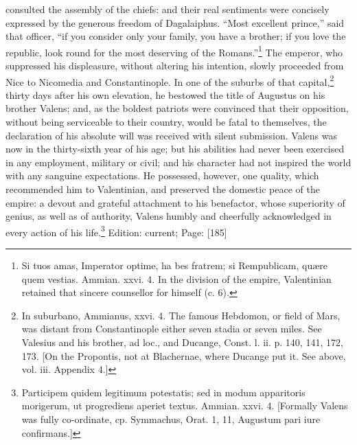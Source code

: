 consulted the assembly of the chiefs: and their real sentiments were concisely expressed by the generous freedom of Dagalaiphus. \texthebrew{“}Most excellent prince,\texthebrew{}” said that officer, \texthebrew{“}if you consider only your family, you have a brother; if you love the republic, look round for the most deserving of the Romans.\texthebrew{}”\footnote{Si tuos amas, Imperator optime, ha bes fratrem; si Rempublicam, quære quem vestias. Ammian. xxvi. 4. In the division of the empire, Valentinian retained that sincere counsellor for himself (c. 6).} The emperor, who suppressed his displeasure, without altering his intention, slowly proceeded from Nice to Nicomedia and Constantinople. In one of the suburbs of that capital,\footnote{In suburbano, Ammianus, xxvi. 4. The famous Hebdomon, or field of Mars, was distant from Constantinople either seven stadia or seven miles. See Valesius and his brother, ad loc., and Ducange, Const. l. ii. p. 140, 141, 172, 173. [On the Propontis, not at Blachernae, where Ducange put it. See above, vol. iii. Appendix 4.]} thirty days after his own elevation, he bestowed the title of Augustus on his brother Valens; and, as the boldest patriots were convinced that their opposition, without being serviceable to their country, would be fatal to themselves, the declaration of his absolute will was received with silent submission. Valens was now in the thirty-sixth year of his age; but his abilities had never been exercised in any employment, military or civil; and his character had not inspired the world with any sanguine expectations. He possessed, however, one quality, which recommended him to Valentinian, and preserved the domestic peace of the empire: a devout and grateful attachment to his benefactor, whose superiority of genius, as well as of authority, Valens humbly and cheerfully acknowledged in every action of his life.\footnote{Participem quidem legitimum potestatis; sed in modum apparitoris morigerum, ut progrediens aperiet textus. Ammian. xxvi. 4. [Formally Valens was fully co-ordinate, cp. Symmachus, Orat. 1, 11, Augustum pari iure confirmans.]}
Edition: current; Page: [185]

